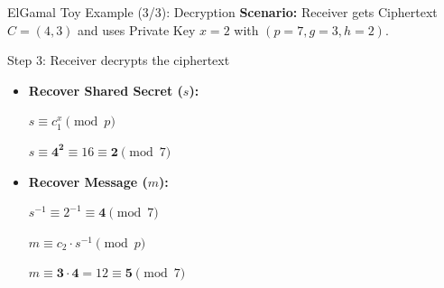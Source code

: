 \documentclass[aspectratio=169, 10pt]{beamer}
\begin{document}
\begin{frame}{ElGamal Toy Example (3/3): Decryption}
    \textbf{Scenario:} Receiver gets Ciphertext $C = (4, 3)$ and uses Private Key $x = 2$ with $(p=7, g=3, h=2)$.
    
    \vspace{0.3cm}
    \begin{block}{Step 3: Receiver decrypts the ciphertext}
        \begin{itemize}
            \item \textbf{Recover Shared Secret ($s$):}
            \begin{center}
            $s \equiv c_1^x \pmod p$
            \end{center}
            \begin{center}
                $s \equiv \textbf{4}^{\textbf{2}} \equiv 16 \equiv \textbf{2} \pmod 7$
            \end{center}
            \vspace{0.2cm}
            \item \textbf{Recover Message ($m$):}
            \begin{center}
            $s^{-1} \equiv 2^{-1} \equiv \textbf{4} \pmod 7$                 
            \end{center}
            \begin{center}
            $m \equiv c_2 \cdot s^{-1} \pmod p$
            \end{center}
            \begin{center}
                $m \equiv \textbf{3} \cdot \textbf{4} = 12 \equiv \textbf{5} \pmod 7$
            \end{center}
        \end{itemize}
    \end{block}
\end{frame}
\end{document}
